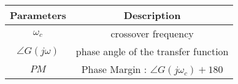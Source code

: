 \begin{tabular}{|c|c|}
\hline
\textbf{Parameters} & \textbf{Description} \\
\hline
$\omega_c$ & crossover frequency \\
\hline
$\angle G(j\omega)$ & phase angle of the transfer function \\
\hline
$PM$ & Phase Margin : $\angle G(j\omega_c)+180$\\
\hline
\end{tabular}
